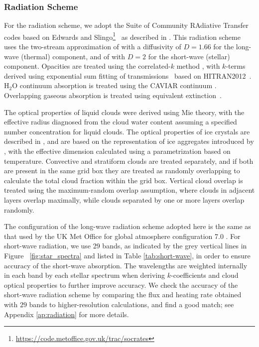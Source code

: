 \documentclass[11pt,numberedappendix,twocolappendix,]{emulateapj}
\begin{document}
\subsubsection{Radiation Scheme}
\label{sss:radiation}

For the radiation scheme, we adopt the Suite of Community RAdiative Transfer codes based on Edwards and Slingo\footnote{\url{https://code.metoffice.gov.uk/trac/socrates}}~\citep[SOCRATES,][]{EdwardsSlingo1996,Edwards1996} as described in \citet{Way2017}.
This radiation scheme uses the two-stream approximation of \citet{Zdunkowski1985} with a diffusivity of $D=1.66$ for the long-wave (thermal) component, and of \citet{Zdunkowski1980} with $D=2$ for the short-wave (stellar) component. 
Opacities are treated using the correlated-$k$ method \citep{Lacis1991,Goody1989}, with $k$-terms derived using exponential sum fitting of transmissions~\citep{Wiscombe1977} based on HITRAN2012~\citep{Rothman2013}. 
H$_2$O continuum absorption is treated using the CAVIAR continuum \citep{Ptashnik2011}.
Overlapping gaseous absorption is treated using equivalent extinction~\citep{Edwards1996,Amundsen2016}. 

The optical properties of liquid clouds were derived using Mie theory, with the effective radius diagnosed from the cloud water content assuming a specified number concentration for liquid clouds. 
The optical properties of ice crystals are described in \citet{Edwards2007}, and are based on the representation of ice aggregates introduced by \citet{Baran2001}, with the effective dimension calculated using a parametrization based on temperature. 
Convective and stratiform clouds are treated separately, and if both are present in the same grid box they are treated as randomly overlapping to calculate the total cloud fraction within the grid box. 
Vertical cloud overlap is treated using the maximum-random overlap assumption, where clouds in adjacent layers overlap maximally, while clouds separated by one or more layers overlap randomly. 

The configuration of the long-wave radiation scheme adopted here is the same as that used by the UK Met Office for global atmosphere configuration 7.0 \citep[GA7.0;][]{Walters2017}. 
For short-wave radiation, we use 29 bands, as indicated by the grey vertical lines in Figure ~\ref{fig:star_spectra} and listed in Table \ref{tab:short-wave}, in order to ensure accuracy of the short-wave absorption. 
The wavelengths are weighted internally in each band by each stellar spectrum when deriving $k$-coefficients and cloud optical properties to further improve accuracy. 
We check the accuracy of the short-wave radiation scheme by comparing the flux and heating rate obtained with $29$ bands to higher-resolution calculations, and find a good match; see Appendix \ref{ap:radiation} for more details. 
\end{document}
